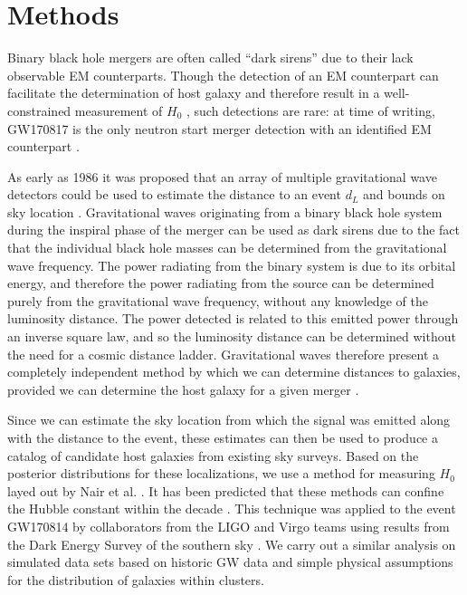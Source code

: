 \section{\label{sec:methods} Methods}


Binary black hole mergers are often called ``dark sirens'' due to their lack observable EM counterparts.
Though the detection of an EM counterpart can facilitate the determination of host galaxy and therefore result in a well-constrained measurement of $H_0$ \cite{GW170817_H0}, such detections are rare: at time of writing, GW170817 is the only neutron start merger detection with an identified EM counterpart \cite{GW170817_announce}.

As early as 1986 it was proposed that an array of multiple gravitational wave detectors could be used to estimate the distance to an event $d_L$ and bounds on sky location \cite{Schutz_1986}.
Gravitational waves originating from a binary black hole system during the inspiral phase of the merger can be used as dark sirens due to the fact that the individual black hole masses can be determined from the gravitational wave frequency.
The power radiating from the binary system is due to its orbital energy, and therefore the power radiating from the source can be determined purely from the gravitational wave frequency, without any knowledge of the luminosity distance.
The power detected is related to this emitted power through an inverse square law, and so the luminosity distance can be determined without the need for a cosmic distance ladder.
Gravitational waves therefore present a completely independent method by which we can determine distances to galaxies, provided we can determine the host galaxy for a given merger \cite{GW170814_DES,GW170817_H0,Nair_2018}.

Since we can estimate the sky location from which the signal was emitted along with the distance to the event, these estimates can then be used to produce a catalog of candidate host galaxies from existing sky surveys.
Based on the posterior distributions for these localizations, we use a method for measuring $H_0$ layed out by Nair et al. \cite{Nair_2018}.
It has been predicted that these methods can confine the Hubble constant within the decade \cite{Chen_2018}.
This technique was applied to the event GW170814 by collaborators from the LIGO and Virgo teams using results from the Dark Energy Survey of the southern sky \cite{GW170814_DES}.
We carry out a similar analysis on simulated data sets based on historic GW data and simple physical assumptions for the distribution of galaxies within clusters.

